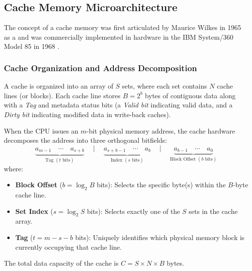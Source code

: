 \subsection{Cache Memory Microarchitecture}\label{sec:cache_microarchitecture}

The concept of a cache memory was first articulated by Maurice Wilkes in 1965 as a \cite{wilkes1965slave} and was commercially implemented in hardware in the IBM System/360 Model 85 in 1968 \cite{liptay1968cache}. 

\subsubsection{Cache Organization and Address Decomposition}
A cache is organized into an array of $S$ sets, where each set contains $N$ cache lines (or blocks). Each cache line stores $B = 2^b$ bytes of contiguous data along with a \textit{Tag} and metadata status bits (a \textit{Valid bit} indicating valid data, and a \textit{Dirty bit} indicating modified data in write-back caches).

When the CPU issues an $m$-bit physical memory address, the cache hardware decomposes the address into three orthogonal bitfields:
\begin{equation}
\underbrace{a_{m-1} \quad \cdots \quad a_{s+b}}_{\text{Tag } (t \text{ bits})} \quad\mid\quad \underbrace{a_{s+b-1} \quad \cdots \quad a_b}_{\text{Index } (s \text{ bits})} \quad\mid\quad \underbrace{a_{b-1} \quad \cdots \quad a_0}_{\text{Block Offset } (b \text{ bits})}
\end{equation}
where:
\begin{itemize}
    \item \textbf{Block Offset} ($b = \log_2 B$ bits): Selects the specific byte(s) within the $B$-byte cache line.
    \item \textbf{Set Index} ($s = \log_2 S$ bits): Selects exactly one of the $S$ sets in the cache array.
    \item \textbf{Tag} ($t = m - s - b$ bits): Uniquely identifies which physical memory block is currently occupying that cache line.
\end{itemize}

The total data capacity of the cache is $C = S \times N \times B$ bytes.

